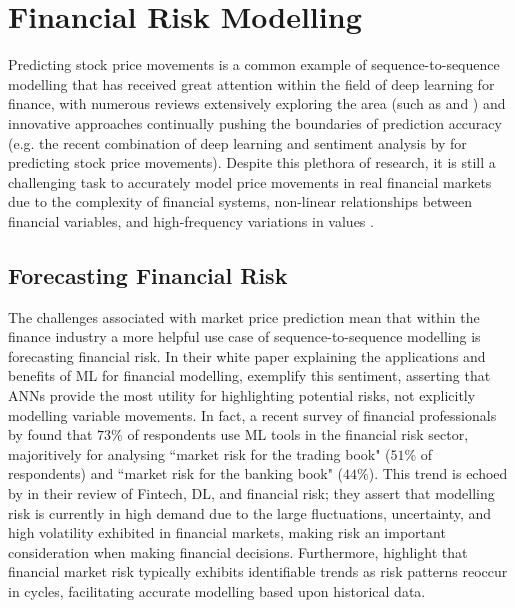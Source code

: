 \documentclass[a4paper, 11pt]{report}
\begin{document}
    \section{Financial Risk Modelling}

    Predicting stock price movements is a common example of sequence-to-sequence modelling that has received great attention within the field of deep learning for finance, with numerous reviews extensively exploring the area (such as \citet{sezer-2019} and \citet{jiang-2021}) and innovative approaches continually pushing the boundaries of prediction accuracy (e.g. the recent combination of deep learning and sentiment analysis by \citet{darapaneni-2022} for predicting stock price movements). Despite this plethora of research, it is still a challenging task to accurately model price movements in real financial markets due to the complexity of financial systems, non-linear relationships between financial variables, and high-frequency variations in values \citep{timmermann-2004}.


    \subsection{Forecasting Financial Risk}

    The challenges associated with market price prediction mean that within the finance industry a more helpful use case of sequence-to-sequence modelling is forecasting financial risk. In their white paper explaining the applications and benefits of ML for financial modelling, \citet{laplante-2019} exemplify this sentiment, asserting that ANNs provide the most utility for highlighting potential risks, not explicitly modelling variable movements. In fact, a recent survey of financial professionals by \citet{chartis-2019} found that $73\%$ of respondents use ML tools in the financial risk sector, majoritively for analysing ``market risk for the trading book" ($51\%$ of respondents) and ``market risk for the banking book" ($44\%$). This trend is echoed by \citet{peng-2021} in their review of Fintech, DL, and financial risk; they assert that modelling risk is currently in high demand due to the large fluctuations, uncertainty, and high volatility exhibited in financial markets, making risk an important consideration when making financial decisions. Furthermore, \citet{mashrur-2020} highlight that financial market risk typically exhibits identifiable trends as risk patterns reoccur in cycles, facilitating accurate modelling based upon historical data.
\end{document}
